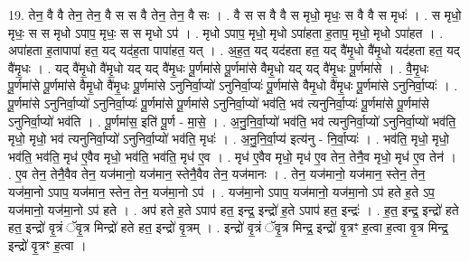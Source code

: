 \documentclass[17pt]{extarticle}
\begin{document}
19. तेन॒ वै वै तेन॒ तेन॒ वै स स वै तेन॒ तेन॒ वै सः । . वै स स वै वै स मृधो॒ मृधः॒ स वै वै स मृधः॑ । . स मृधो॒ मृधः॒ स स मृधो ऽपाप॒ मृधः॒ स स मृधो ऽप॑ । . मृधो ऽपाप॒ मृधो॒ मृधो ऽपा॑हता ह॒ताप॒ मृधो॒ मृधो ऽपा॑हत । . अपा॑हता ह॒तापापा॑ हत॒ यद् यद॑ह॒ता पापा॑हत॒ यत् । . अ॒ह॒त॒ यद् यद॑हता हत॒ यद् वै॑मृ॒धो वै॑मृ॒धो यद॑हता हत॒ यद् वै॑मृ॒धः । . यद् वै॑मृ॒धो वै॑मृ॒धो यद् यद् वै॑मृ॒धः पू॒र्णमा॑से पू॒र्णमा॑से वैमृ॒धो यद् यद् वै॑मृ॒धः पू॒र्णमा॑से । . वै॒मृ॒धः पू॒र्णमा॑से पू॒र्णमा॑से वैमृ॒धो वै॑मृ॒धः पू॒र्णमा॑से ऽनुनिर्वा॒प्यो॑ ऽनुनिर्वा॒प्यः॑ पू॒र्णमा॑से वैमृ॒धो वै॑मृ॒धः पू॒र्णमा॑से ऽनुनिर्वा॒प्यः॑ । . पू॒र्णमा॑से ऽनुनिर्वा॒प्यो॑ ऽनुनिर्वा॒प्यः॑ पू॒र्णमा॑से पू॒र्णमा॑से ऽनुनिर्वा॒प्यो॑ भव॑ति॒ भव॑ त्यनुनिर्वा॒प्यः॑ पू॒र्णमा॑से पू॒र्णमा॑से ऽनुनिर्वा॒प्यो॑ भव॑ति । . पू॒र्णमा॑स॒ इति॑ पू॒र्ण - मा॒से॒ । . अ॒नु॒नि॒र्वा॒प्यो॑ भव॑ति॒ भव॑ त्यनुनिर्वा॒प्यो॑ ऽनुनिर्वा॒प्यो॑ भव॑ति॒ मृधो॒ मृधो॒ भव॑ त्यनुनिर्वा॒प्यो॑ ऽनुनिर्वा॒प्यो॑ भव॑ति॒ मृधः॑ । . अ॒नु॒नि॒र्वा॒प्य॑ इत्य॑नु - नि॒र्वा॒प्यः॑ । . भव॑ति॒ मृधो॒ मृधो॒ भव॑ति॒ भव॑ति॒ मृध॑ ए॒वैव मृधो॒ भव॑ति॒ भव॑ति॒ मृध॑ ए॒व । . मृध॑ ए॒वैव मृधो॒ मृध॑ ए॒व तेन॒ तेनै॒व मृधो॒ मृध॑ ए॒व तेन॑ । . ए॒व तेन॒ तेनै॒वैव तेन॒ यज॑मानो॒ यज॑मान॒ स्तेनै॒वैव तेन॒ यज॑मानः । . तेन॒ यज॑मानो॒ यज॑मान॒ स्तेन॒ तेन॒ यज॑मा॒नो ऽपाप॒ यज॑मान॒ स्तेन॒ तेन॒ यज॑मा॒नो ऽप॑ । . यज॑मा॒नो ऽपाप॒ यज॑मानो॒ यज॑मा॒नो ऽप॑ हते ह॒ते ऽप॒ यज॑मानो॒ यज॑मा॒नो ऽप॑ हते । . अप॑ हते ह॒ते ऽपाप॑ हत॒ इन्द्र॒ इन्द्रो॑ ह॒ते ऽपाप॑ हत॒ इन्द्रः॑ । . ह॒त॒ इन्द्र॒ इन्द्रो॑ हते हत॒ इन्द्रो॑ वृ॒त्रं ॅवृ॒त्र मिन्द्रो॑ हते हत॒ इन्द्रो॑ वृ॒त्रम् । . इन्द्रो॑ वृ॒त्रं ॅवृ॒त्र मिन्द्र॒ इन्द्रो॑ वृ॒त्रꣳ ह॒त्वा ह॒त्वा वृ॒त्र मिन्द्र॒ इन्द्रो॑ वृ॒त्रꣳ ह॒त्वा । \newline
\end{document}
